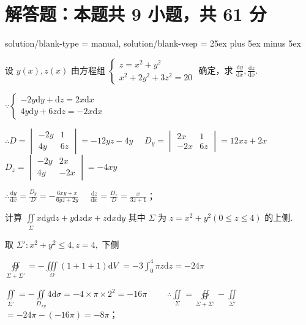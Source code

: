 \section{解答题：本题共 9 小题，共 61 分}
\examsetup
{
    solution/blank-type = manual,
    solution/blank-vsep = 25ex plus 5ex minus 5ex
}

\begin{problem}[points = 6]
设 $y(x), z(x)$ 由方程组 $\begin{cases}
        z = x^2 + y^2 \\
        x^2 + 2y^2 + 3z^2 = 20
    \end{cases}$ 确定，求 $\frac{\mathrm{d}y}{\mathrm{d}x}, \frac{\mathrm{d}z}{\mathrm{d}x}$.
\end{problem}
\begin{solution}
    $\because \begin{cases}
            -2y\mathrm{d}y + \mathrm{d}z = 2x\mathrm{d}x \\
            4y\mathrm{d}y + 6z\mathrm{d}z = -2x\mathrm{d}x
        \end{cases}$

    $\therefore D = \begin{vmatrix}
            -2y & 1  \\
            4y  & 6z
        \end{vmatrix} = -12yz - 4y \quad$
    $D_y = \begin{vmatrix}
            2x  & 1  \\
            -2x & 6z
        \end{vmatrix} = 12xz + 2x \quad$
    $D_z = \begin{vmatrix}
            -2y & 2x  \\
            4y  & -2x
        \end{vmatrix} = -4xy$

    $\therefore \frac{\mathrm{d}y}{\mathrm{d}x} = \frac{D_y}{D} = -\frac{6xy + x}{6yz + 2y} \quad$
    $\frac{\mathrm{d}z}{\mathrm{d}x} = \frac{D_z}{D} = \frac{x}{3z + 1}$；
\end{solution}

\begin{problem}[points = 7]
计算 $\iint\limits_{\Sigma} x\mathrm{d}y\mathrm{d}z + y\mathrm{d}z\mathrm{d}x + z\mathrm{d}x\mathrm{d}y$
其中 $\Sigma$ 为 $z = x^2 + y^2(0 \leq z \leq 4)$ 的上侧.
\end{problem}
\begin{solution}
    取 $\Sigma': x^2 + y^2 \leq 4, z = 4, $ 下侧

    $\oiint\limits_{\Sigma + \Sigma'} = -\iiint\limits_{\Omega} (1 + 1 + 1)\mathrm{d}V$
    $= -3\int_0^4 \pi z\mathrm{d}z = -24\pi$

    $\iint\limits_{\Sigma'} = -\iint\limits_{D_{xy}} 4\mathrm{d}\sigma = -4\times\pi\times2^2 = -16\pi \qquad$
    $\therefore \iint\limits_{\Sigma} = \oiint\limits_{\Sigma + \Sigma'} - \iint\limits_{\Sigma'}$
    $= -24\pi - (-16\pi) = -8\pi$；
\end{solution}

